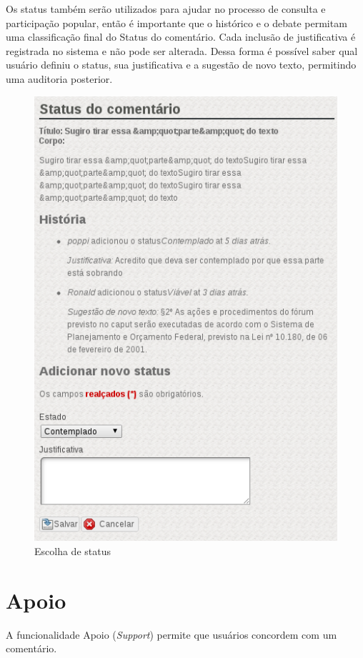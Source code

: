 \documentclass[11pt]{article}
\begin{document}
Os status também serão utilizados para ajudar no processo de
consulta e participação popular, então é importante que o histórico e o
debate permitam uma classificação final do Status do comentário. Cada
inclusão de justificativa é registrada no sistema e não pode ser
alterada. Dessa forma é possível saber qual usuário definiu o status,
sua justificativa e a sugestão de novo texto, permitindo uma
auditoria posterior.

\begin{figure}[h]
\center
\includegraphics[scale=0.5]{new-status-page-and-history.png}
\caption{Escolha de status}
\label{fig:new-status-page-and-history}
\end{figure}

\section{Apoio}

A funcionalidade Apoio ({\it Support}) permite que usuários concordem com
um comentário.
\end{document}
